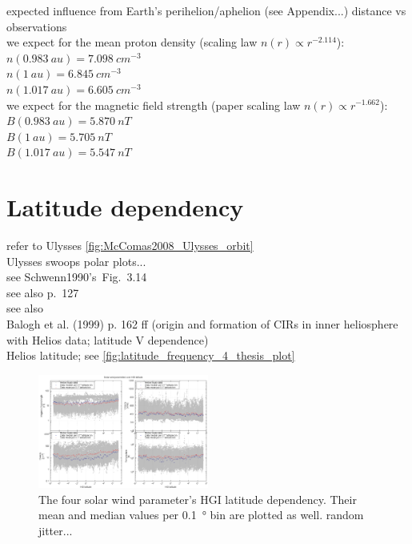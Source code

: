 expected influence from Earth's perihelion/aphelion (see Appendix...) distance vs observations\\
we expect for the mean proton density (scaling law $n(r) \propto r^{-2.114}$):\\
$n(0.983~au) = 7.098~cm^{-3}$\\
$n(1~au) = 6.845~cm^{-3}$\\
$n(1.017~au) = 6.605~cm^{-3}$\\
we expect for the magnetic field strength (paper scaling law $n(r) \propto r^{-1.662}$):\\
$B(0.983~au) = 5.870~nT$\\
$B(1~au) = 5.705~nT$\\
$B(1.017~au) = 5.547~nT$\\


\section{Latitude dependency}
refer to Ulysses \autoref{fig:McComas2008_Ulysses_orbit}\\
Ulysses swoops polar plots...\\

see Schwenn1990's~Fig.~3.14\\
see also \citet{Schwenn1990} p.~127\\
see also \citet{Richardson1995}\\
Balogh et al. (1999) p. 162 ff (origin and formation of CIRs in inner heliosphere with Helios data; latitude V dependence)\\

Helios latitude; see \autoref{fig:latitude_frequency_4_thesis_plot}
\begin{figure}[htb]
	\centering
	\includegraphics[width=0.5\textwidth]{images/gnuplots/latitude_frequency_4_thesis_plot.png}
	\caption{The four solar wind parameter's HGI latitude dependency. Their mean and median values per \SI{0.1}{\degree} bin are plotted as well. random jitter...}
	\label{fig:latitude_frequency_4_thesis_plot}
\end{figure}

